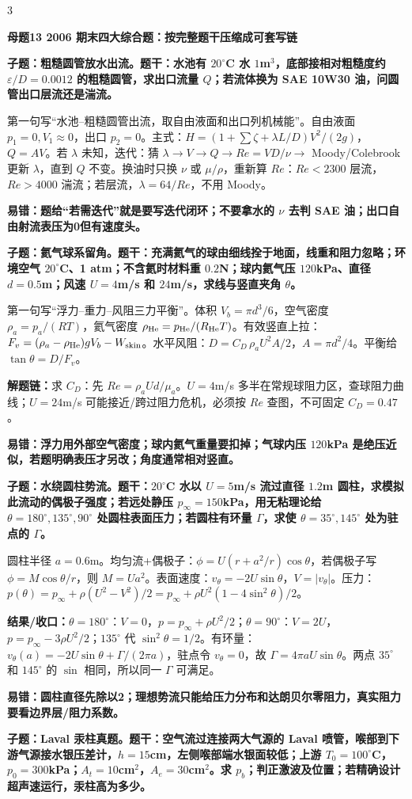 \documentclass[a4paper]{article}
\newcommand{\mt}[1]{\vspace{0.45pt}\colorbox{M}{\parbox{\dimexpr\linewidth-2\fboxsep}{\color{white}\bfseries #1}}\par}
\newcommand{\qt}[1]{\vspace{0.25pt}\colorbox{Q}{\parbox{\dimexpr\linewidth-2\fboxsep}{\color{white}\bfseries #1}}\par}
\newcommand{\ans}[1]{\colorbox{G}{\parbox{\dimexpr\linewidth-2\fboxsep}{#1}}\par}
\newcommand{\warn}[1]{\colorbox{Y}{\parbox{\dimexpr\linewidth-2\fboxsep}{\color{E}\bfseries #1}}\par}
\newcommand{\chain}[1]{{\color{A}\bfseries 解题链：}#1\par}
\newcommand{\res}[1]{{\color{E}\bfseries 结果/收口：}#1\par}
\begin{document}
\begin{multicols}{3}
\mt{母题13 2006 期末四大综合题：按完整题干压缩成可套写链}
\qt{子题：粗糙圆管放水出流。题干：水池有 $20^\circ$C 水 $1$m$^3$，底部接相对粗糙度约 $\varepsilon/D=0.0012$ 的粗糙圆管，求出口流量 $Q$；若流体换为 SAE 10W30 油，问圆管出口层流还是湍流。}
\ans{第一句写“水池--粗糙圆管出流，取自由液面和出口列机械能”。自由液面 $p_1=0,V_1\approx0$，出口 $p_2=0$。主式：$H=(1+\sum\zeta+\lambda L/D)V^2/(2g)$，$Q=AV$。若 $\lambda$ 未知，迭代：猜 $\lambda\to V\to Q\to Re=VD/\nu\to$ Moody/Colebrook 更新 $\lambda$，直到 $Q$ 不变。换油时只换 $\nu$ 或 $\mu/\rho$，重新算 $Re$：$Re<2300$ 层流，$Re>4000$ 湍流；若层流，$\lambda=64/Re$，不用 Moody。}
\warn{易错：题给“若需迭代”就是要写迭代闭环；不要拿水的 $\nu$ 去判 SAE 油；出口自由射流表压为0但有速度头。}
\qt{子题：氦气球系留角。题干：充满氦气的球由细线拴于地面，线重和阻力忽略；环境空气 $20^\circ$C、1 atm；不含氦时材料重 $0.2$N；球内氦气压 $120$kPa、直径 $d=0.5$m；风速 $U=4$m/s 和 $24$m/s，求线与竖直夹角 $\theta$。}
\ans{第一句写“浮力--重力--风阻三力平衡”。体积 $V_b=\pi d^3/6$，空气密度 $\rho_a=p_a/(RT)$，氦气密度 $\rho_{\rm He}=p_{\rm He}/(R_{\rm He}T)$。有效竖直上拉：$F_v=(\rho_a-\rho_{\rm He})gV_b-W_{\rm skin}$。水平风阻：$D=C_D\,\rho_aU^2A/2$，$A=\pi d^2/4$。平衡给 $\tan\theta=D/F_v$。}
\chain{求 $C_D$：先 $Re=\rho_aUd/\mu_a$。$U=4$m/s 多半在常规球阻力区，查球阻力曲线；$U=24$m/s 可能接近/跨过阻力危机，必须按 $Re$ 查图，不可固定 $C_D=0.47$。}
\warn{易错：浮力用外部空气密度；球内氦气重量要扣掉；气球内压 $120$kPa 是绝压近似，若题明确表压才另改；角度通常相对竖直。}
\qt{子题：水绕圆柱势流。题干：$20^\circ$C 水以 $U=5$m/s 流过直径 $1.2$m 圆柱，求模拟此流动的偶极子强度；若远处静压 $p_\infty=150$kPa，用无粘理论给 $\theta=180^\circ,135^\circ,90^\circ$ 处圆柱表面压力；若圆柱有环量 $\Gamma$，求使 $\theta=35^\circ,145^\circ$ 处为驻点的 $\Gamma$。}
\ans{圆柱半径 $a=0.6$m。均匀流+偶极子：$\phi=U(r+a^2/r)\cos\theta$，若偶极子写 $\phi=M\cos\theta/r$，则 $M=Ua^2$。表面速度：$v_\theta=-2U\sin\theta$，$V=|v_\theta|$。压力：$p(\theta)=p_\infty+\rho(U^2-V^2)/2=p_\infty+\rho U^2(1-4\sin^2\theta)/2$。}
\res{$\theta=180^\circ$：$V=0$，$p=p_\infty+\rho U^2/2$；$\theta=90^\circ$：$V=2U$，$p=p_\infty-3\rho U^2/2$；$135^\circ$ 代 $\sin^2\theta=1/2$。有环量：$v_\theta(a)=-2U\sin\theta+\Gamma/(2\pi a)$，驻点令 $v_\theta=0$，故 $\Gamma=4\pi aU\sin\theta$。两点 $35^\circ$ 和 $145^\circ$ 的 $\sin$ 相同，所以同一 $\Gamma$ 可满足。}
\warn{易错：圆柱直径先除以2；理想势流只能给压力分布和达朗贝尔零阻力，真实阻力要看边界层/阻力系数。}
\qt{子题：Laval 汞柱真题。题干：空气流过连接两大气源的 Laval 喷管，喉部到下游气源接水银压差计，$h=15$cm，左侧喉部端水银面较低；上游 $T_0=100^\circ$C，$p_0=300$kPa；$A_t=10$cm$^2$，$A_e=30$cm$^2$。求 $p_b$；判正激波及位置；若精确设计超声速运行，汞柱高为多少。}

\end{multicols}
\end{document}
